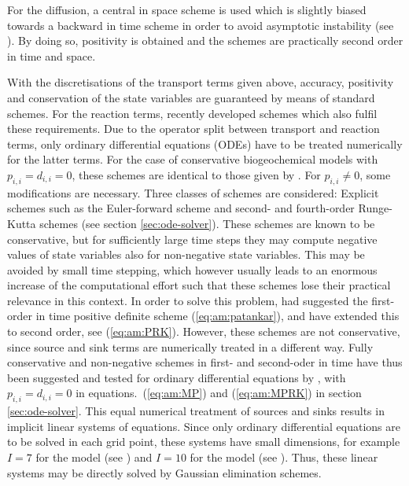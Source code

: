 For the diffusion, a
central in space scheme is used which is slightly biased towards
a backward in time scheme in order to avoid asymptotic instability
(see \cite{Samarskij84}). By doing so, positivity is obtained and the schemes
are practically second order in time and space.

With the discretisations of the transport terms given above,
accuracy, positivity and conservation of the state variables are
guaranteed by means of standard schemes. For the reaction terms,
\cite{Burchardetal2003b} recently developed schemes which also fulfil these
requirements.
Due to the operator split between transport and reaction terms,
only ordinary differential equations (ODEs)
have to be treated numerically for the latter terms.
For the case of conservative biogeochemical models with
$p_{i,i}=d_{i,i}=0$, these schemes are identical to those given
by \cite{Burchardetal2003b}.
For $p_{i,i}\not= 0$, some modifications are necessary.
Three classes of schemes are considered:
Explicit schemes such as the Euler-forward scheme and second- and
fourth-order Runge-Kutta schemes (see section \ref{sec:ode-solver}).
These schemes are known to be conservative, but for
sufficiently large time steps they may compute negative values
of state variables also for non-negative state variables.
This may be avoided by small time stepping, which however usually
leads to an enormous increase of the computational effort such that
these schemes lose their practical relevance in this context.
In order to solve this problem,
\cite{Patankar80} had suggested the first-order in time
positive definite scheme
(\ref{eq:am:patankar}), and \cite{Burchardetal2003b} have extended this
to second order, see (\ref{eq:am:PRK}).
However, these schemes are not conservative, since
source and sink terms are numerically treated in a different way.
Fully conservative and non-negative schemes in first- and second-oder
in time have thus been suggested and tested for
ordinary differential equations by \cite{Burchardetal2003b},
with $p_{i,i}=d_{i,i}=0$ in equations.\ (\ref{eq:am:MP}) and (\ref{eq:am:MPRK})
in section \ref{sec:ode-solver}.
This equal numerical treatment of sources and sinks
results in implicit linear systems of equations.
Since only ordinary differential equations are to be solved in each
grid point, these systems have small dimensions, for example $I=7$ for
the \cite{Fashametal1990} model (see \cite{Burchardetal05}) and
$I=10$ for the \cite{Neumannetal2002} model 
(see \cite{Burchardetal05}).
Thus, these linear systems may be directly solved
by Gaussian elimination schemes.
